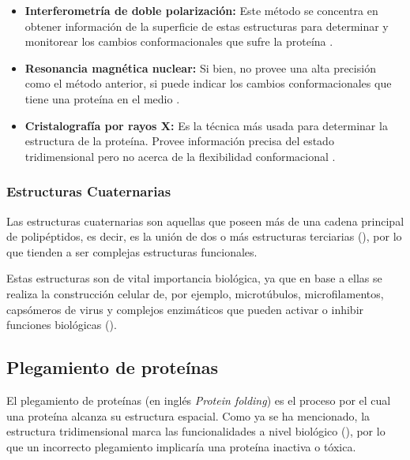 \begin{itemize}
	\item \textbf{Interferometría de doble polarización:} Este método se concentra en obtener información de la superficie de estas estructuras para determinar y monitorear los cambios conformacionales que sufre la proteína \cite[Cap.\ 11]{bioinfopt}.
	\item \textbf{Resonancia magnética nuclear:} Si bien, no provee una alta precisión como el método anterior, si puede indicar los cambios conformacionales que tiene una proteína en el medio \cite[Cap.\ 12]{bioinfopt}.
	\item \textbf{Cristalografía por rayos X:} Es la técnica más usada para determinar la estructura de la proteína. Provee información precisa del estado tridimensional pero no acerca de la flexibilidad conformacional \cite[Cap.\ 13]{bioinfopt}.
	
\end{itemize}

\subsubsection{Estructuras Cuaternarias}
Las estructuras cuaternarias son aquellas que poseen más de una cadena principal de polipéptidos, es decir, es la unión de dos o más estructuras terciarias (\citealp{branden:1999}), por lo que tienden a ser complejas estructuras funcionales.

Estas estructuras son de vital importancia biológica, ya que en base a ellas se realiza la construcción celular de, por ejemplo, microtúbulos, microfilamentos, capsómeros de virus y complejos enzimáticos que pueden activar o inhibir funciones biológicas (\cite[Cap.\ 4.3]{lehninger}). 

\subsection{Plegamiento de proteínas}
\label{fundamentos:plegamiento}

El plegamiento de proteínas (en inglés \textit{Protein folding}) es el proceso por el cual una proteína alcanza su estructura espacial. Como ya se ha mencionado, la estructura tridimensional marca las funcionalidades a nivel biológico (\citealp{Alberts:2002}), por lo que un incorrecto plegamiento implicaría una proteína inactiva o tóxica.

